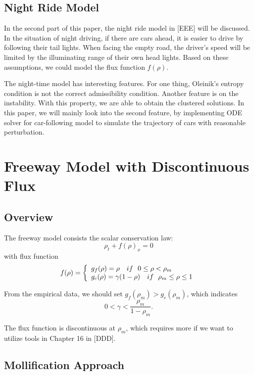 \documentclass[10pt]{article}
\begin{document}
\subsection{Night Ride Model}

In the second part of this paper, the night ride model in [EEE] will be discussed. In the situation of night driving, if there are cars ahead, it is easier to drive by following their tail lights. When facing the empty road, the driver's speed will be limited by the illuminating range of their own head lights. Based on these assumptions, we could model the flux function $f(\rho)$.

The night-time model has interesting features. For one thing, Oleinik's entropy condition is not the correct admissibility condition. Another feature is on the instability. With this property, we are able to obtain the clustered solutions. In this paper, we will mainly look into the second feature, by implementing ODE solver for car-following model to simulate the trajectory
of cars with reasonable perturbation.
\section{Freeway Model with Discontinuous Flux}
\label{sec:sec2}
\subsection{Overview}

The freeway model consists the scalar conservation law:
\[
\rho_t + f(\rho)_x = 0
\]
with flux function
 \[f(\rho)=\left\{
  \begin{array}{l l}
    g_f(\rho)=\rho \ \ \ if\ \  0\leq \rho <\rho_m\\
    g_c(\rho)=\gamma(1-\rho) \ \ \ if\ \ \rho_m\leq\rho\leq 1
  \end{array} \right.\]

  From the empirical data, we should set $g_f(\rho_m)>g_c(\rho_m)$, which indicates
  \[
  0<\gamma<\frac{\rho_m}{1-\rho_m}.
  \]

  The flux function is discontinuous at $\rho_m$, which requires more if we want to utilize tools in Chapter 16 in [DDD].
\subsection{Mollification Approach}
\end{document}
